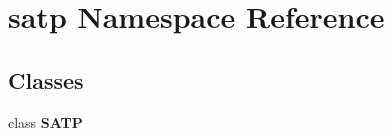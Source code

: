 \section{satp Namespace Reference}
\label{namespacesatp}


\subsection*{Classes}
\begin{CompactItemize}
\item 
class {\bf SATP}
\end{CompactItemize}
